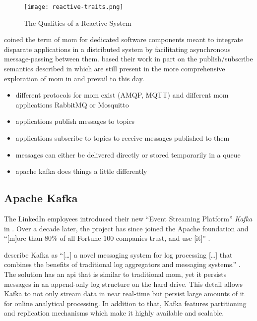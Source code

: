 \begin{figure}
  \centering
  \texttt{[image: reactive-traits.png]}
  \caption{The Qualities of a Reactive System \parencite{boner_reactive_2014}}
  \label{fig:reactive-traits}
\end{figure}

\cite{banavar_case_1999} coined the term of \acrlong{mom} for dedicated software components meant to integrate disparate applications in a distributed system by facilitating asynchronous message-passing between them.
\citeauthor{banavar_case_1999} based their work in part on the publish/subscribe semantics described in \cite{oki_information_1993} which are still present in the more comprehensive exploration of \gls{mom} in \cite{curry_message-oriented_2004} and prevail to this day.

\begin{itemize}
  \item different protocols for mom exist (AMQP, MQTT) and different mom applications RabbitMQ or Mosquitto
  \item applications publish messages to topics
  \item applications subscribe to topics to receive messages published to them
  \item messages can either be delivered directly or stored temporarily in a queue
  \item apache kafka does things a little differently
\end{itemize}

\subsection{Apache Kafka}

The LinkedIn employees \citeauthor{kreps_kafka_2011} introduced their new \enquote{Event Streaming Platform} \emph{Kafka} in \citeyear{kreps_kafka_2011} \parencite{kreps_kafka_2011}.
Over a decade later, the project has since joined the Apache foundation and \enquote{[m]ore than 80\% of all Fortune 100 companies trust, and use [it]} \parencite{apache_software_foundation_apache_nodate}.

\citeauthor{kreps_kafka_2011} describe Kafka as \enquote{[\ldots] a novel messaging system for log processing [\ldots] that combines the benefits of traditional log aggregators and messaging systems.} \parencite{kreps_kafka_2011}.
The solution has an \gls{api} that is similar to traditional \gls{mom}, yet it persists messages in an append-only log structure on the hard drive.
This detail allows Kafka to not only stream data in near real-time but persist large amounts of it for online analytical processing.
In addition to that, Kafka features partitioning and replication mechanisms which make it highly available and scalable. \parencite{kreps_kafka_2011}

